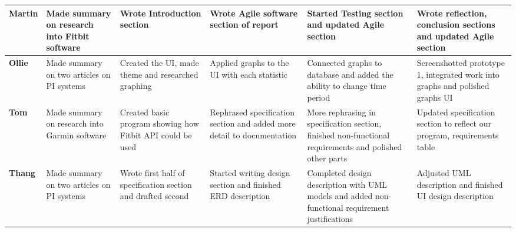 \documentclass[12pt]{article}
\begin{document}
\newpage
\begin{table}[!ht]
\begin{adjustwidth}{-3cm}{-3cm}
\centering
\begin{tabular}{|p{1.5cm}|p{3.1cm}|p{3cm}|p{3cm}|p{3cm}|p{3cm}|}
\hline
\textbf{Martin} & Made summary on research into Fitbit software & Wrote Introduction section & Wrote Agile software section of report & Started Testing section and updated Agile section & Wrote reflection, conclusion sections and updated Agile section  \\
\hline
\textbf{Ollie} & Made summary on two articles on PI systems & Created the UI, made theme and researched graphing & Applied graphs to the UI with each statistic & Connected graphs to database and added the ability to change time period & Screenshotted prototype 1, integrated work into graphs and polished graphs UI\\
\hline
\textbf{Tom} & Made summary on research into Garmin software & Created basic program showing how Fitbit API could be used & Rephrased specification section and added more detail to documentation & More rephrasing in specification section, finished non-functional requirements and polished other parts & Updated specification section to reflect our program, requirements table \\
\hline
\textbf{Thang} &  Made summary on two articles on PI systems & Wrote first half of specification section and drafted second & Started writing design section and finished ERD description & Completed design description with UML models and added non-functional requirement justifications & Adjusted UML description and finished UI design description \\
\hline
\end{tabular}
\end{adjustwidth}
\end{table}
\end{document}
